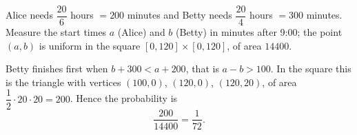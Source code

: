 Alice needs $\dfrac{20}{6}$ hours $=200$ minutes and Betty needs $\dfrac{20}{4}$ hours $=300$ minutes. Measure the start times $a$ (Alice) and $b$ (Betty) in minutes after 9:00; the point $(a,b)$ is uniform in the square $[0,120]\times[0,120]$, of area $14400$.

Betty finishes first when $b+300<a+200$, that is $a-b>100$. In the square this is the triangle with vertices $(100,0)$, $(120,0)$, $(120,20)$, of area $\dfrac{1}{2}\cdot20\cdot20=200$. Hence the probability is
\[
\dfrac{200}{14400}=\boxed{\dfrac{1}{72}}.
\]
